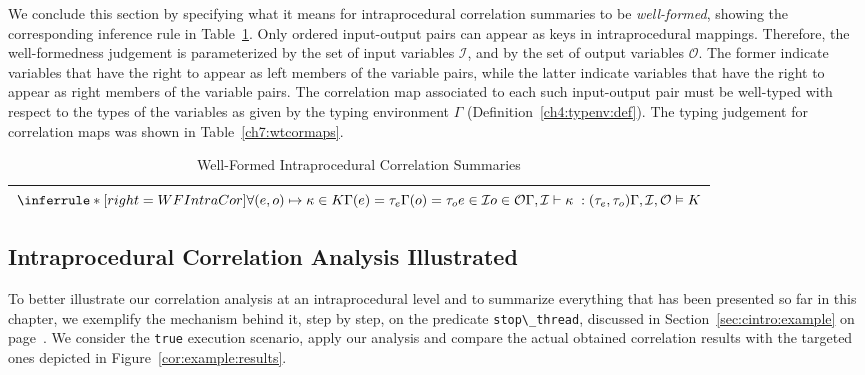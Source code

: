 \documentclass[11pt]{article}
\newcommand{\disp}[1]{\lstinline&#1&}
\def\inpset{\mathcal{I}}
\begin{document}
\def\opset{\mathcal{O}}

We conclude this section by specifying what it means for intraprocedural
correlation summaries to be \emph{well-formed}, showing the corresponding
inference rule in Table~\ref{ch7:wfintra}. Only ordered input-output pairs
can appear as keys in intraprocedural mappings. Therefore, the well-formedness 
judgement is parameterized by the set of input variables $\inpset$, 
and by the set of output variables $\opset$.
The former indicate variables that have the right to appear as left members of the
variable pairs, while the latter indicate variables that have the right to appear as 
right members of the variable pairs. 
The correlation map associated to each such input-output pair must be well-typed 
with respect to the types of the variables as given by the typing environment $\Gamma$ 
(Definition~\ref{ch4:typenv:def}). 
The typing judgement for correlation maps was shown in Table~\ref{ch7:wtcormaps}.    

\begin{longtable}{@{}c@{}}
\caption{Well-Formed Intraprocedural Correlation Summaries \newline}
\label{ch7:wfintra}
\endlastfoot
\toprule
%
$\inferrule*[right= WFIntraCor]
{ \forall (e, o) \mapsto \corv \in \intracor \; \\ \Gamma(e) = \tau_e \\
\Gamma(o) = \tau_o \\ e \in \inpset \\ o \in \opset \\\\ 
\Gamma, \inpset \vdash \corv \; : (\tau_e, \tau_o)
}
{\Gamma, \inpset, \opset  \vDash \intracor}
$
\\
\bottomrule
\end{longtable}


\subsection{Intraprocedural Correlation Analysis Illustrated}\label{sec:cor:example}

To better illustrate our correlation analysis at an intraprocedural level and to 
summarize everything that has been presented so far in this chapter, we 
exemplify the mechanism behind it, step by step, on the predicate \disp{stop\_thread}, 
discussed in Section~\ref{sec:cintro:example} on page~\pageref{cor:example:body}. 
We consider the \disp{true} execution 
scenario, apply our analysis and compare the actual obtained correlation results with 
the targeted ones depicted in Figure~\ref{cor:example:results}.
\end{document}
